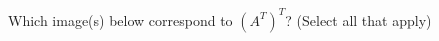 \documentclass{ximera}
\begin{document}
\begin{problem}
\begin{selectAll}
  \end{selectAll}
  
  Which image(s) below correspond to $(A^T)^T$? (Select all that apply)
  
  \begin{selectAll}
  
  
  \end{selectAll}
  
  
  \end{problem}
\end{document}

